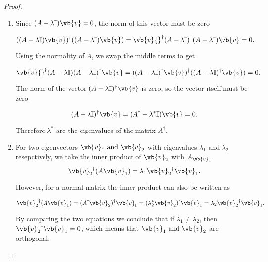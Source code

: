 \documentclass[a4paper,12pt]{report}
\begin{document}
\begin{proof}
\begin{enumerate}[label=(\(P\)\arabic*)]
    \item Since \((A-\lambda \mathbb{I})\vb{v} = 0\), the norm of this vector must be zero
    
    \begin{equation}
        ((A-\lambda \mathbb{I})\vb{v} ){}^{\dagger} ((A-\lambda \mathbb{I})\vb{v} ) = \vb{v} {}^{\dagger} (A-\lambda \mathbb{I}){}^{\dagger} (A-\lambda \mathbb{I})\vb{v} =0.
    \end{equation}

    Using the normality of \(A\), we swap the middle terms to get 

    \begin{equation}
        \vb{v} {}^{\dagger} (A-\lambda \mathbb{I})(A-\lambda \mathbb{I}){}^{\dagger} \vb{v} = ((A-\lambda \mathbb{I}){}^{\dagger} \vb{v} ){}^{\dagger} ((A-\lambda \mathbb{I}){}^{\dagger} \vb{v} ) = 0.
    \end{equation}
    
    The norm of the vector \((A-\lambda \mathbb{I}){}^{\dagger} \vb{v}\) is zero, so the vector itself must be zero

    \begin{equation}
        (A-\lambda \mathbb{I}){}^{\dagger} \vb{v} = (A^{\dagger} - \lambda ^*\mathbb{I})\vb{v} =0.
    \end{equation}

    Therefore \(\lambda ^*\) are the eigenvalues of the matrix \(A^{\dagger} \).  
    
    \item For two eigenvectors \(\vb{v} _{1} \text { and } \vb{v} _{2}  \) with eigenvalues \(\lambda _{1} \text { and } \lambda _{2}  \) resepctively, we take the inner product of \(\vb{v} _{2} \) with \(A_{\vb{v} _{1} } \)
    \begin{equation}
        \vb{v} _{2} {}^{\dagger} (A\vb{v} _{1}) = \lambda _{1} \vb{v} _{2} {}^{\dagger}\vb{v} _{1}. 
    \end{equation}

    However, for a normal matrix the inner product can also be written as 

    \begin{equation}
        \vb{v} _{2} {}^{\dagger} (A\vb{v} _{1}) = (A^{\dagger} \vb{v} _{2}) {}^{\dagger}  \vb{v} _{1} = (\lambda _{2}^* \vb{v} _{2} ){}^{\dagger} \vb{v} _{1} = \lambda _{2}\vb{v} _{2} {}^{\dagger}   \vb{v} _{1}. 
    \end{equation}

    By comparing the two equations we conclude that if \(\lambda _{1} \neq \lambda _{2}  \), then \(\vb{v} _{2}{}^{\dagger} \vb{v} _{1} = 0 \), which means that \(\vb{v} _{1} \text { and } \vb{v} _{2}\) are orthogonal.    
\end{enumerate}

\end{proof}
\end{document}
